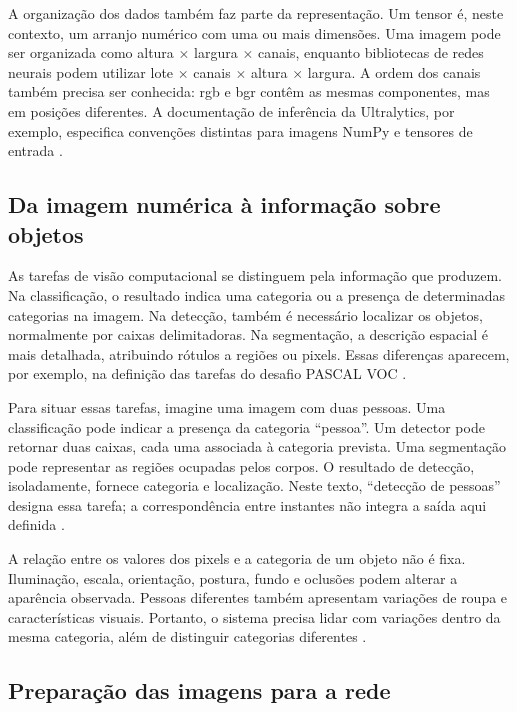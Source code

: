 A organização dos dados também faz parte da representação. Um tensor é, neste contexto, um arranjo numérico com uma ou mais dimensões. Uma imagem pode ser organizada como altura \(\times\) largura \(\times\) canais, enquanto bibliotecas de redes neurais podem utilizar lote \(\times\) canais \(\times\) altura \(\times\) largura. A ordem dos canais também precisa ser conhecida: \gls{rgb} e \gls{bgr} contêm as mesmas componentes, mas em posições diferentes. A documentação de inferência da Ultralytics, por exemplo, especifica convenções distintas para imagens NumPy e tensores de entrada \cite{ultralytics-predict}.

\subsection{Da imagem numérica à informação sobre objetos}
\label{subsec:tarefas-visao}

As tarefas de visão computacional se distinguem pela informação que produzem. Na classificação, o resultado indica uma categoria ou a presença de determinadas categorias na imagem. Na detecção, também é necessário localizar os objetos, normalmente por caixas delimitadoras. Na segmentação, a descrição espacial é mais detalhada, atribuindo rótulos a regiões ou pixels. Essas diferenças aparecem, por exemplo, na definição das tarefas do desafio PASCAL VOC \cite{pascal}.

Para situar essas tarefas, imagine uma imagem com duas pessoas. Uma classificação pode indicar a presença da categoria ``pessoa''. Um detector pode retornar duas caixas, cada uma associada à categoria prevista. Uma segmentação pode representar as regiões ocupadas pelos corpos. O resultado de detecção, isoladamente, fornece categoria e localização. Neste texto, ``detecção de pessoas'' designa essa tarefa; a correspondência entre instantes não integra a saída aqui definida \cite{pascal}.

A relação entre os valores dos pixels e a categoria de um objeto não é fixa. Iluminação, escala, orientação, postura, fundo e oclusões podem alterar a aparência observada. Pessoas diferentes também apresentam variações de roupa e características visuais. Portanto, o sistema precisa lidar com variações dentro da mesma categoria, além de distinguir categorias diferentes \cite{stanford-imagens}.

\subsection{Preparação das imagens para a rede}
\label{subsec:pre-processamento}

